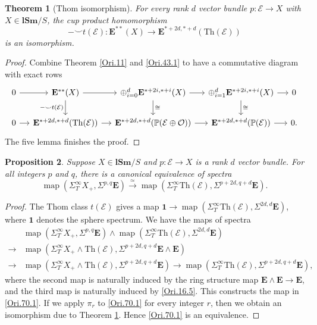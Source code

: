 \documentclass[11pt, a4paper]{amsart}
\newtheorem{thm}{Theorem}[subsection]
\newtheorem{prop}[thm]{Proposition}
\theoremstyle{definition}
\numberwithin{equation}{subsection}
\renewcommand{\P}{\mathbb{P}}
\newcommand{\lSm}{\mathbf{lSm}}
\newcommand{\Thom}{\mathrm{Th}}
\newcommand{\cE}{\mathcal{E}}
\newcommand{\cO}{\mathcal{O}}
\newcommand{\ringE}{\mathbf{E}}
\newcommand{\map}{\operatorname{map}}
\begin{document}
\begin{thm}[Thom isomorphism]
\label{Ori.16}
For every rank $d$ vector bundle $p\colon \cE\to X$ with $X\in \lSm/S$, 
the cup product homomorphism
\begin{equation}
\label{Ori.16.4}
-\smile t(\cE)
\colon
\ringE^{**}(X)
\to
\ringE^{*+2d,*+d}(\Thom(\cE))
\end{equation}
is an isomorphism.
\end{thm}
\begin{proof}
Combine Theorem \ref{Ori.11} and \eqref{Ori.43.1} to have a commutative diagram with exact rows
\[
\begin{tikzcd}[column sep=small]
0\ar[r]&
\ringE^{**}(X)\ar[d,"-\smile t(\cE)"']\ar[r]&
\oplus_{i=0}^d \ringE^{*+2i,*+i}(X)\ar[d,"\cong"]\ar[r]&
\oplus_{i=1}^d \ringE^{*+2i,*+i}(X)\ar[d,"\cong"]\ar[r]&
0
\\
0\ar[r]&
\ringE^{*+2d,*+d}(\Thom(\cE))\ar[r]&
\ringE^{*+2d,*+d}(\P(\cE\oplus \cO))\ar[r]&
\ringE^{*+2d,*+d}(\P(\cE))\ar[r]&
0.
\end{tikzcd}
\]
The five lemma finishes the proof.
\end{proof}

\begin{prop}
\label{Ori.70}
Suppose $X\in \lSm/S$ and $p\colon \cE\to X$ is a rank $d$ vector bundle.
For all integers $p$ and $q$, there is a canonical equivalence of spectra
\begin{equation}
\label{Ori.70.1}
\map(\Sigma_T^\infty X_+,\Sigma^{p,q}\ringE)
\xrightarrow{\simeq}
\map(\Sigma_T^\infty \Thom(\cE),\Sigma^{p+2d,q+d}\ringE).
\end{equation}
\end{prop}
\begin{proof}
The Thom class $t(\cE)$ gives a map $\mathbf{1}\to \map(\Sigma_T^\infty \Thom(\cE),\Sigma^{2d,d}\ringE)$, 
where $\mathbf{1}$ denotes the sphere spectrum.
We have the maps of spectra
\begin{align*}
&\map(\Sigma_T^\infty X_+,\Sigma^{p,q}\ringE)\wedge \map(\Sigma_T^\infty \Thom(\cE),\Sigma^{2d,d}\ringE)
\\
\to &
\map(\Sigma_T^\infty X_+\wedge \Thom(\cE),\Sigma^{p+2d,q+d}\ringE\wedge \ringE)
\\
\to &
\map(\Sigma_T^\infty X_+\wedge \Thom(\cE),\Sigma^{p+2d,q+d}\ringE)
\to
\map(\Sigma_T^\infty \Thom(\cE),\Sigma^{p+2d,q+d}\ringE),
\end{align*}
where the second map is naturally induced by the ring structure map $\ringE \wedge \ringE \to \ringE$, 
and the third map is naturally induced by \eqref{Ori.16.5}.
This constructs the map in \eqref{Ori.70.1}.
If we apply $\pi_r$ to \eqref{Ori.70.1} for every integer $r$, 
then we obtain an isomorphism due to Theorem \ref{Ori.16}.
Hence \eqref{Ori.70.1} is an equivalence.
\end{proof}
\end{document}
